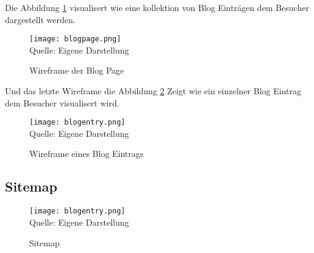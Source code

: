 Die Abbildung \ref*{fig:BlogPage} visualisert wie eine kollektion von Blog Einträgen dem Besucher dargestellt werden.

\begin{figure}[H]
    \caption{Wireframe der Blog Page}\label{fig:BlogPage}
    \texttt{[image: blogpage.png]}
    \\
    Quelle: Eigene Darstellung
\end{figure}

Und das letzte Wireframe die Abbildung \ref*{fig:BlogEntry} Zeigt wie ein einzelner Blog Eintrag dem Besucher visualisert wird.
\begin{figure}[H]
    \caption{Wireframe eines Blog Eintrags}\label{fig:BlogEntry}
    \texttt{[image: blogentry.png]}
    \\
    Quelle: Eigene Darstellung
\end{figure}
 
\subsection{ Sitemap }

\begin{figure}[H]
    \caption{Sitemap}\label{fig:Sitemap}
    \texttt{[image: blogentry.png]}
    \\
    Quelle: Eigene Darstellung
\end{figure}


\newpage


